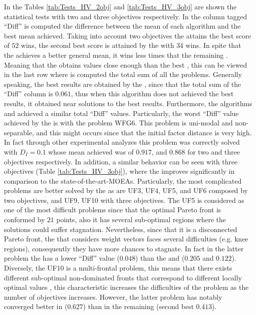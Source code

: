 In the Tables \ref{tab:Tests_HV_2obj} and \ref{tab:Tests_HV_3obj} are shown the statistical tests with two and three objectives respectively.
%
In the column tagged ``Diff'' is computed the difference between the mean of each algorithm and the best mean achieved.
%
Taking into account two objectives the \VSDMOEA{} attains the best score of $52$ wins, the second best score is attained by the \RMOEA{} with $34$ wins.
%
In spite that the \NSGAII{} achieves a better general mean, it wins less times that the remaining \MOEAS{}.
%
Meaning that the \NSGAII{} obtains values close enough than the best \MOEA{}, this can be viewed in the last row where is computed the total sum of all the problems.
%
Generally speaking, the best results are obtained by the \VSDMOEA{}, since that the total sum of the ``Diff'' column is $0.061$, thus when this algorithm does not achieved the best results, it obtained near solutions to the best results.
%
Furthermore, the algorithms \RMOEA{} and \MOEAD{} achieved a similar total ``Diff'' values.
%
Particularly, the worst ``Diff'' value achieved by the \VSDMOEA{} is with the problem WFG6.
%
This problem is uni-modal and non-separable, and this might occurs since that the initial factor distance is very high.
%
In fact through other experimental analyzes this problem was correctly solved with $D_I=0.1$ whose mean achieved  was of $0.917$, and $0.868$ for two and three objectives respectively.
%
In addition, a similar behavior can be seen with three objectives (Table \ref{tab:Tests_HV_3obj}), where the \VSDMOEA{} improves significantly in comparison to the state-of-the-art-MOEAs.
%
Particularly, the most complicated problems are better solved by the \VSDMOEA{} as are UF3, UF4, UF5, and UF6 composed by two objectives, and UF9, UF10 with three objectives.
%
The UF5 is considered as one of the most difficult problems since that the optimal Pareto front is conformed by $21$ points, also it has several sub-optimal regions where the solutions could suffer stagnation. 
%
Nevertheless, since that it is a disconnected Pareto front, the \MOEAS{} that considers weight vectors faces several difficulties (e.g. knee regions), consequently they have more chances to stagnate.
%
In fact in the latter problem the \NSGAII{} has a lower ``Diff'' value ($0.048$) than the \MOEAD{} and \RMOEA{} ($0.205$ and $0.122$).
%
Diversely, the UF10 is a multi-frontal problem, this means that there exists different sub-optimal non-dominated fronts that correspond to different locally optimal values \cite{huband2006review}, this characteristic increases the difficulties of the problem as the number of objectives increases.
%
However, the latter problem has notably converged better in \VSDMOEA{} ($0.627$) than in the remaining \MOEAS{} (second best $0.413$).
%


